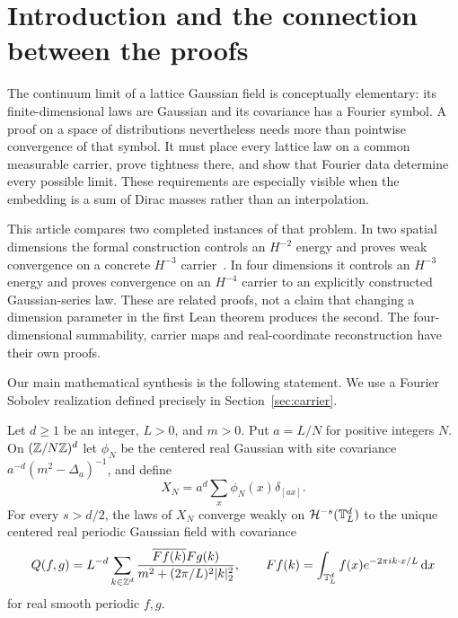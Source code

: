 \section{Introduction and the connection between the proofs}\label{sec:intro}
The continuum limit of a lattice Gaussian field is conceptually elementary:
its finite-dimensional laws are Gaussian and its covariance has a Fourier
symbol. A proof on a space of distributions nevertheless needs more than
pointwise convergence of that symbol. It must place every lattice law on a
common measurable carrier, prove tightness there, and show that Fourier data
determine every possible limit. These requirements are especially visible
when the embedding is a sum of Dirac masses rather than an interpolation.

This article compares two completed instances of that problem. In two
spatial dimensions the formal construction controls an $H^{-2}$ energy and
proves weak convergence on a concrete $H^{-3}$ carrier~\cite{aiXiv2D}. In four
dimensions
it controls an $H^{-3}$ energy and proves convergence on an $H^{-4}$ carrier
to an explicitly constructed Gaussian-series law. These are related proofs,
not a claim that changing a dimension parameter in the first Lean theorem
produces the second. The four-dimensional summability, carrier maps and
real-coordinate reconstruction have their own proofs.

Our main mathematical synthesis is the following statement. We use a Fourier
Sobolev realization defined precisely in Section~\ref{sec:carrier}.
\begin{theorem}\label{thm:main}
Let $d\geq1$ be an integer, $L>0$, and $m>0$. Put $a=L/N$ for positive
integers $N$. On $(\mathbb Z/N\mathbb Z)^d$ let $\phi_N$ be the centered real Gaussian with
site covariance $a^{-d}(m^2-\Delta_a)^{-1}$, and define
\begin{equation}\label{eq:lift}
 X_N=a^d\sum_x\phi_N(x)\delta_{[ax]}.
\end{equation}
For every $s>d/2$, the laws of $X_N$ converge weakly on $\mathcal H^{-s}(\mathbb T_L^d)$
to the unique centered real periodic Gaussian field with covariance
\begin{equation}\label{eq:target-cov}
 Q(f,g)=L^{-d}\sum_{k\in\mathbb Z^d}
 \frac{\overline{Ff(k)}Fg(k)}{m^2+(2\pi/L)^2\lvert k\rvert_2^2},\qquad
 Ff(k)=\int_{\mathbb T_L^d}f(x)e^{-2\pi i k\cdot x/L}\,\mathrm d x
\end{equation}
for real smooth periodic $f,g$.
\end{theorem}

